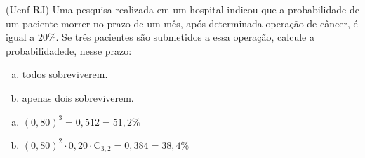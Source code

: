\begin{ex}
(Uenf-RJ) Uma pesquisa realizada em um hospital indicou que a probabilidade de um paciente morrer no prazo de um mês, após determinada operação de câncer, é igual a 20\%.
Se três pacientes são submetidos a essa operação, calcule a probabilidadede, nesse prazo:
   \begin{enumerate}[(a)]
   \item todos sobreviverem.
   \item apenas dois sobreviverem.
   \end{enumerate}
    \begin{sol}
     \phantom{A}
       \begin{enumerate} [(a)]
           \item $(0,80)^3=0,512=51,2\%$
           \item $(0,80)^2\cdot0,20\cdot \mathrm{C}_{3,2}=0,384=38,4\%$
       \end{enumerate}
    \end{sol}
\end{ex}